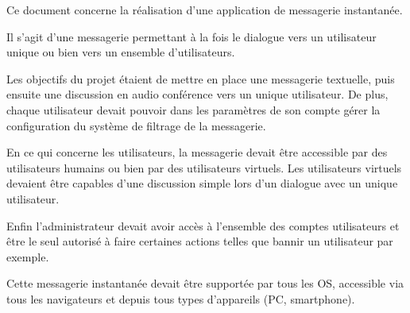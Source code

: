 	\par Ce document concerne la réalisation d'une application de messagerie instantanée.
	\par Il s’agit d’une messagerie permettant à la fois le dialogue vers un utilisateur unique ou bien vers un ensemble d’utilisateurs.
	\par Les objectifs du projet étaient de mettre en place une messagerie textuelle, puis ensuite une discussion en audio conférence vers un unique utilisateur. De plus, chaque utilisateur devait pouvoir dans les paramètres de son compte gérer la configuration du système de filtrage de la messagerie. \\

	\par En ce qui concerne les utilisateurs, la messagerie devait être accessible par des utilisateurs humains ou bien par des utilisateurs virtuels. Les utilisateurs virtuels devaient être capables d’une discussion simple lors d’un dialogue avec un unique utilisateur.
	\par Enfin l’administrateur devait avoir accès à l’ensemble des comptes utilisateurs et être le seul autorisé à faire certaines actions telles que bannir un utilisateur par exemple. \\

	\par Cette messagerie instantanée devait être supportée par tous les OS, accessible via tous les navigateurs et depuis tous types d’appareils (PC, smartphone).
